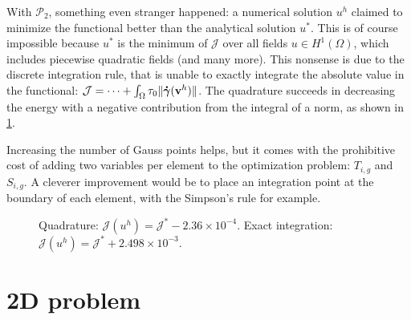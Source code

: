 \documentclass[11 pt]{report}
\begin{document}
\pagebreak
With $\mathcal{P}_2$, something even stranger happened: a numerical solution $u^h$ claimed to minimize the functional better than the analytical solution $u^*$. This is of course impossible because $u^*$ is the minimum of $\mathcal{J}$ over all fields $u \in H^1(\Omega)$, which includes piecewise quadratic fields (and many more). This nonsense is due to the discrete integration rule, that is unable to exactly integrate the absolute value in the functional: $\mathcal{J} = \dots + \int_{\Omega}\tau_0 \|\boldsymbol{\dot \gamma}(\mathbf{v}^h)\|$. The quadrature succeeds in decreasing the energy with a negative contribution from the integral of a norm, as shown in \cref{fig:sensibility_quad}.

Increasing the number of Gauss points helps, but it comes with the prohibitive cost of adding two variables per element to the optimization problem: $T_{i,g}$ and $S_{i,g}$. A cleverer improvement would be to place an integration point at the boundary of each element, with the Simpson's rule for example.

\begin{figure}[!b]
    \centering
    
    \caption{Quadrature: $\mathcal{J}(u^h) = \mathcal{J}^* - 2.36\times 10^{-4}$. Exact integration: $\mathcal{J}(u^h) = \mathcal{J}^* + 2.498\times 10^{-3}$.}
    \label{fig:sensibility_quad}
\end{figure}




\chapter{2D problem}

\end{document}
